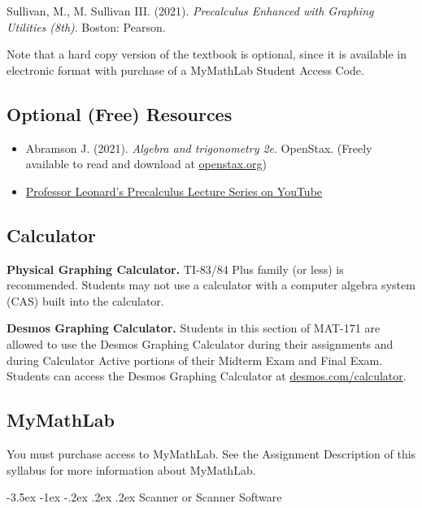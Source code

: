 \documentclass[11pt]{article}
\makeatletter
\renewcommand\section{\@startsection{section}{1}{0pt}%
  {-3.5ex \@plus -1ex \@minus -.2ex}%
  {.2ex \@plus.2ex}%
  {\normalfont\Large\bfseries}} %
\makeatother
\begin{document}
Sullivan, M., M. Sullivan III. (2021). \textit{Precalculus Enhanced with Graphing Utilities (8th)}. Boston: Pearson.

Note that a hard copy version of the textbook is optional, since it is available in electronic format with purchase of a MyMathLab Student Access Code.

\subsection{Optional (Free) Resources}

\begin{itemize}
\item Abramson J. (2021). \textit{Algebra and trigonometry 2e}. OpenStax. (Freely available to read and download at \href{https://openstax.org/details/books/algebra-and-trigonometry-2e.}{openstax.org})


\item \href{https://youtube.com/playlist?list=PLDesaqWTN6ESsmwELdrzhcGiRhk5DjwLP\&si=G7hNZvDueWkJ9Ydf}{Professor Leonard's Precalculus Lecture Series on YouTube}
\end{itemize}

\subsection{Calculator}

\textbf{Physical Graphing Calculator.} TI-83/84 Plus family (or less) is recommended. Students may not use a calculator with a computer algebra system (CAS) built into the calculator.

\textbf{Desmos Graphing Calculator.} Students in this section of MAT-171 are allowed to use the Desmos Graphing Calculator during their assignments and during Calculator Active portions of their Midterm Exam and Final Exam. Students can access the Desmos Graphing Calculator at \href{https://www.desmos.com/calculator}{desmos.com/calculator}.

\subsection{MyMathLab}

You must purchase access to MyMathLab. See the Assignment Description of this syllabus for more information about MyMathLab.

\section{Scanner or Scanner Software}
\end{document}
